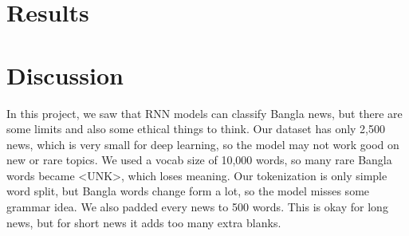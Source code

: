 \documentclass[pdflatex,sn-mathphys-num]{sn-jnl}
\theoremstyle{thmstyleone}\newtheorem{theorem}{Theorem}
\theoremstyle{thmstyletwo}\newtheorem{example}{Example}\newtheorem{remark}{Remark}
\theoremstyle{thmstylethree}\newtheorem{definition}{Definition}
\begin{document}
\section{Results}







\section{Discussion}

In this project, we saw that RNN models can classify Bangla news, but there are some limits and also some ethical things to think. Our dataset has only 2,500 news, which is very small for deep learning, so the model may not work good on new or rare topics. We used a vocab size of 10,000 words, so many rare Bangla words became <UNK>, which loses meaning. Our tokenization is only simple word split, but Bangla words change form a lot, so the model misses some grammar idea. We also padded every news to 500 words. This is okay for long news, but for short news it adds too many extra blanks.
\end{document}
